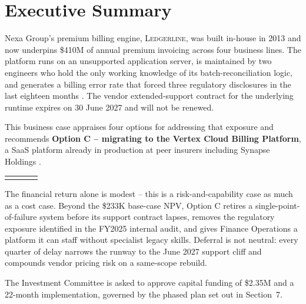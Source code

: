 \section{Executive Summary}

Nexa Group's premium billing engine, \textsc{Ledgerline}, was built in-house in 2013 and now
underpins \$410M of annual premium invoicing across four business lines. The platform runs on
an unsupported application server, is maintained by two engineers who hold the only working
knowledge of its batch-reconciliation logic, and generates a billing error rate that forced
three regulatory disclosures in the last eighteen months \cite{osei2025auditfindings}. The
vendor extended-support contract for the underlying runtime expires on 30 June 2027 and will
not be renewed.

This business case appraises four options for addressing that exposure and recommends
\textbf{Option C -- migrating to the Vertex Cloud Billing Platform}, a SaaS platform already
in production at peer insurers including Synapse Holdings \cite{brightlane2025benchmark}.

\begin{center}
\begin{tabularx}{\linewidth}{@{}Y Y Y Y@{}}
 &
 &
 &
 \\
\end{tabularx}
\end{center}

\begin{tcolorbox}[infobox, title={\faBullseye\ Why now}]
The financial return alone is modest -- this is a risk-and-capability case as much as a cost
case. Beyond the \$233K base-case NPV, Option C retires a single-point-of-failure system before
its support contract lapses, removes the regulatory exposure identified in the FY2025 internal
audit, and gives Finance Operations a platform it can staff without specialist legacy skills.
Deferral is not neutral: every quarter of delay narrows the runway to the June 2027 support
cliff and compounds vendor pricing risk on a same-scope rebuild.
\end{tcolorbox}

The Investment Committee is asked to approve capital funding of \$2.35M and a 22-month
implementation, governed by the phased plan set out in Section~7.
